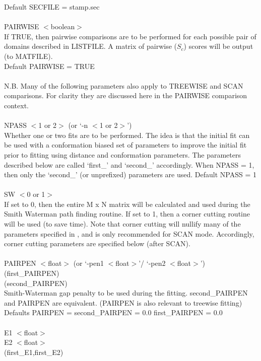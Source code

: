 Default SECFILE = stamp.sec\\
\\
PAIRWISE $<$boolean$>$\\
If TRUE, then pairwise comparisons are to be performed for each 
possible pair of domains described in LISTFILE.  A matrix of
pairwise ($S_{c}$) scores will be output (to MATFILE).\\
Default PAIRWISE = TRUE\\
\\
N.B. Many of the following parameters also apply to TREEWISE and
SCAN comparisons.  For clarity they are discussed here in the
PAIRWISE comparison context.\\
\\
NPASS $<$1 or 2$>$ (or `-n  $<$1 or 2$>$')\\
Whether one or two fits are to be performed.  The idea is that the 
initial fit can be used with a conformation biased set of
parameters to improve the initial fit prior to fitting using
distance and conformation parameters.  The parameters described
below are called `first\_' and `second\_' accordingly.  When NPASS =
1, then only the `second\_' (or unprefixed) parameters are used.
Default NPASS = 1\\
\\
SW $<$0 or 1$>$ \\
If set to 0, then the entire M x N matrix will be calculated and
used during the Smith Waterman path finding routine.  If set to 1,
then a corner cutting routine will be used (to save time).  Note
that corner cutting will nullify many of the parameters specified
in \cite{rb92b}, and is only recommended for SCAN mode. 
Accordingly, corner cutting parameters are specified below (after
SCAN).\\
\\
PAIRPEN $<$float$>$ (or `-pen1 $<$float$>$'/ `-pen2 $<$float$>$')\\
(first\_PAIRPEN)\\
(second\_PAIRPEN)\\
Smith-Waterman gap penalty to be used during the fitting. 
second\_PAIRPEN and PAIRPEN are equivalent. (PAIRPEN is also
relevant to treewise fitting)\\
Defaults PAIRPEN = second\_PAIRPEN = 0.0  first\_PAIRPEN = 0.0\\
\\
E1 $<$float$>$ \\
E2 $<$float$>$\\
(first\_E1,first\_E2)\\
